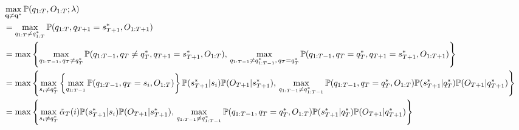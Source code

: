 \begin{align*}
&\max_{\mathbf{q} \ne \mathbf{q}^*} \mathbb{P}(q_{1:T}, O_{1:T}; \lambda) \\
&= \max_{q_{1:T} \ne q_{1:T}^*} \mathbb{P}(q_{1:T}, q_{T+1} = s_{T+1}^*, O_{1:T+1}) \\
&= \max \left\{
    \max_{q_{1:T-1}, \, q_T \ne q_T^*} \mathbb{P}(q_{1:T-1}, q_T \ne q_T^*, q_{T+1} = s_{T+1}^*, O_{1:T}), \,
    \max_{q_{1:T-1} \ne q_{1:T-1}^*, \, q_T = q_T^*} \mathbb{P}(q_{1:T-1}, q_T = q_T^*, q_{T+1} = s_{T+1}^*, O_{1:T+1}) 
   \right\} \\
&= \max \left\{
   \max_{s_i \ne q_T^*} \left\{ \max_{q_{1:T-1}} \mathbb{P}(q_{1:T-1}, q_T = s_i, O_{1:T}) \right\} 
        \mathbb{P}(s_{T+1}^* |s_i) \mathbb{P}(O_{T+1} | s_{T+1}^*), \,
   \max_{q_{1:T-1} \ne q_{1:T-1}^*} \mathbb{P}(q_{1:T-1}, q_T = q_T^*, O_{1:T}) \mathbb{P}(s_{T+1}^* |q_{T}^*) \mathbb{P}(O_{T+1} |q_{T+1}^*)
   \right\} \\
&= \max \left\{
   \max_{s_i \ne q_T^*} \tilde{\alpha}_{T}(i)
        \mathbb{P}(s_{T+1}^* |s_i) \mathbb{P}(O_{T+1} | s_{T+1}^*), \,
   \max_{q_{1:T-1} \ne q_{1:T-1}^*} \mathbb{P}(q_{1:T-1}, q_T = q_T^*, O_{1:T}) \mathbb{P}(s_{T+1}^* |q_{T}^*) \mathbb{P}(O_{T+1} |q_{T+1}^*)
   \right\} 
\end{align*}
